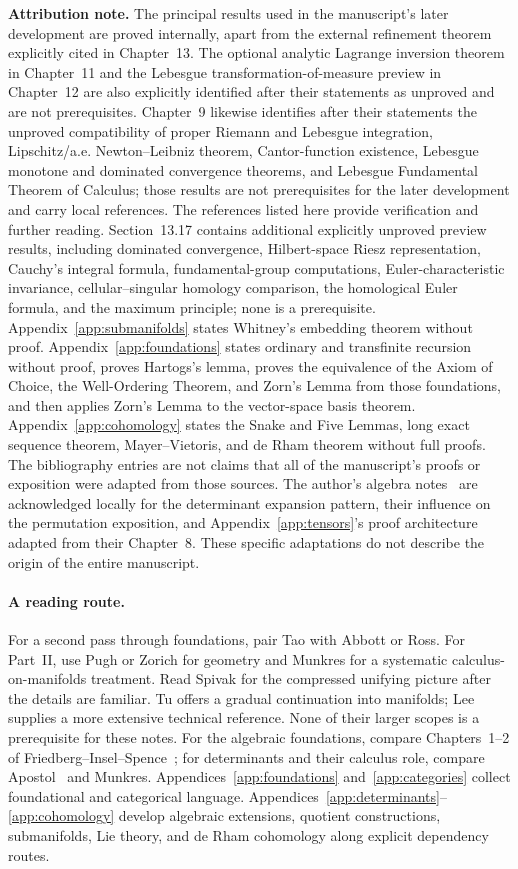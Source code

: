 \noindent\textbf{Attribution note.}
The principal results used in the manuscript's later development are proved
internally, apart from the external refinement theorem explicitly cited in
Chapter~13. The optional analytic Lagrange inversion theorem in Chapter~11
and the Lebesgue transformation-of-measure preview in Chapter~12 are also
explicitly identified after their statements as unproved and are not
prerequisites. Chapter~9 likewise identifies after their statements the
unproved compatibility of proper Riemann and Lebesgue integration,
Lipschitz/a.e. Newton--Leibniz theorem, Cantor-function existence, Lebesgue
monotone and dominated convergence theorems, and Lebesgue Fundamental Theorem
of Calculus; those results are not prerequisites for the later
development and carry local references. The references listed here provide
verification and further reading. Section~13.17 contains additional explicitly
unproved preview results, including dominated convergence, Hilbert-space Riesz
representation, Cauchy's integral formula, fundamental-group computations,
Euler-characteristic invariance, cellular--singular homology comparison,
the homological Euler formula, and the maximum
principle; none is a prerequisite. Appendix~\ref{app:submanifolds} states Whitney's embedding
theorem without proof. Appendix~\ref{app:foundations} states ordinary and
transfinite recursion without proof, proves Hartogs's lemma, proves the
equivalence of the Axiom of Choice, the Well-Ordering Theorem, and Zorn's
Lemma from those foundations, and then applies Zorn's Lemma to the
vector-space basis theorem. Appendix~\ref{app:cohomology}
states the Snake and Five Lemmas, long exact sequence theorem,
Mayer--Vietoris, and de Rham theorem without full proofs.
The bibliography entries are not claims that all of the
manuscript's proofs or exposition were adapted from those sources. The
author's algebra notes~\cite{chen-algebra} are acknowledged
locally for the determinant expansion pattern, their influence on the
permutation exposition, and Appendix~\ref{app:tensors}'s proof architecture adapted from
their Chapter~8. These specific adaptations do not describe the origin
of the entire manuscript.

\paragraph{A reading route.}
For a second pass through foundations, pair Tao with Abbott or Ross.
For Part~II, use Pugh or Zorich for geometry and Munkres for a systematic
calculus-on-manifolds treatment. Read Spivak for the compressed unifying
picture after the details are familiar. Tu offers a gradual continuation
into manifolds; Lee supplies a more extensive technical reference. None of
their larger scopes is a prerequisite for these notes.
For the algebraic foundations, compare Chapters~1--2 of
Friedberg--Insel--Spence~\cite{fis-linear}; for determinants and their
calculus role, compare Apostol~\cite{apostol-calculus-two} and Munkres.
Appendices~\ref{app:foundations} and~\ref{app:categories} collect foundational
and categorical language. Appendices~\ref{app:determinants}--\ref{app:cohomology}
develop algebraic extensions, quotient constructions, submanifolds,
Lie theory, and de Rham cohomology along explicit dependency routes.
